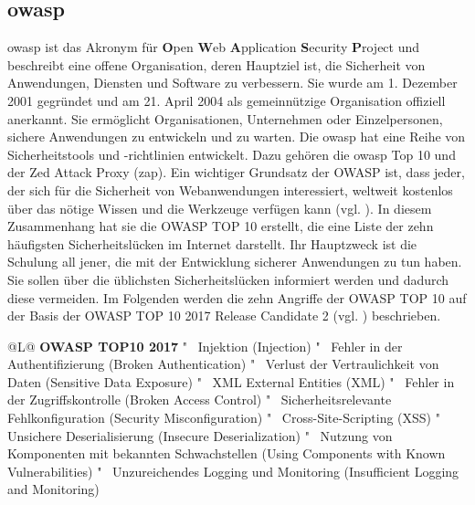 \subsection{\acs{owasp}}

\acs{owasp} ist das Akronym für \textbf{O}pen \textbf{W}eb
\textbf{A}pplication \textbf{S}ecurity \textbf{P}roject und
beschreibt eine offene Organisation, deren Hauptziel ist, die
Sicherheit von Anwendungen, Diensten und Software zu verbessern.
Sie wurde am 1. Dezember 2001 gegründet und am 21. April 2004 als
gemeinnützige Organisation offiziell anerkannt.  Sie ermöglicht
Organisationen, Unternehmen oder Einzelpersonen, sichere Anwendungen zu
entwickeln und zu warten. Die \acs{owasp} hat eine Reihe von
Sicherheitstools und -richtlinien entwickelt. Dazu gehören die \acs{owasp}
Top 10 und der Zed Attack Proxy (\acs{zap}). Ein wichtiger
Grundsatz der OWASP ist, dass jeder, der sich für die Sicherheit
von Webanwendungen interessiert, weltweit kostenlos über das
nötige Wissen und die Werkzeuge verfügen kann (vgl. \cite{owasp}).
In diesem Zusammenhang hat sie die OWASP TOP 10 erstellt, die eine
Liste der zehn häufigsten Sicherheitslücken im Internet
darstellt. Ihr Hauptzweck ist die Schulung all jener, die mit der
Entwicklung sicherer Anwendungen zu tun haben.  Sie sollen über die
üblichsten Sicherheitslücken informiert werden und dadurch diese
vermeiden.  Im Folgenden werden die zehn Angriffe der OWASP TOP
10 auf der Basis der OWASP TOP 10 2017 
Release Candidate 2 (vgl. \cite{Stock2017}) beschrieben.

\begin{table}[h]
    \begin{tabulary}{\textwidth}{@{}L@{}}
        \toprule
        \textbf{OWASP TOP10 2017} \tabularnewline{}"~ Injektion (Injection)
        "~ Fehler in der Authentifizierung (Broken Authentication)
        "~ Verlust der Vertraulichkeit von Daten (Sensitive Data Exposure)
        "~ XML External Entities (XML)
        "~ Fehler in der Zugriffskontrolle (Broken Access Control)
        "~ Sicherheitsrelevante Fehlkonfiguration (Security Misconfiguration)
        "~ Cross-Site-Scripting (XSS)
        "~ Unsichere Deserialisierung (Insecure Deserialization)
        "~ Nutzung von Komponenten mit bekannten Schwachstellen (Using Components with Known Vulnerabilities)
        "~ Unzureichendes Logging und Monitoring (Insufficient Logging and Monitoring)
        \tabularnewline\bottomrule
    \end{tabulary}
    \caption{OWASP TOP 10 2017}\label{tab:OWASP_TOP_10}
\end{table}







